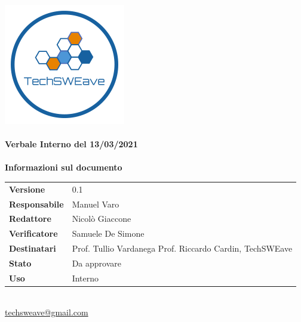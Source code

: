 \documentclass[a4paper]{article}
\begin{document}
        
    \begin{titlepage}
        \begin{center}
            \includegraphics{../../../../Images/logo.png}\\
            \vspace{20px}
            \textcolor{logo}{\hrulefill}\\
            \vspace{20px}
            \textbf{\huge\textcolor{logo}{Verbale Interno del 13/03/2021}}\\
            \vspace{10px}
            \textcolor{logo}{\hrulefill}\\
            \vspace{40px}
            \textbf{\Large Informazioni sul documento}\\
            \vspace{20px}
            \begin{tabular}{p{100px} | p{100px}}
                \textbf{Versione} & 0.1\\
                \textbf{Responsabile} & Manuel Varo\\
                \textbf{Redattore} & Nicolò Giaccone\\
                \textbf{Verificatore} & Samuele De Simone\\
                \textbf{Destinatari} & Prof. Tullio Vardanega \newline Prof. Riccardo Cardin, \newline TechSWEave\\
                \textbf{Stato} & Da approvare\\
                \textbf{Uso} & Interno\\
            \end{tabular}\\
            \vspace{60px}
            \href{mailto:techsweave@gmail.com}{techsweave@gmail.com}\\
    
        \end{center}
        \end{titlepage}
    
\end{document}
